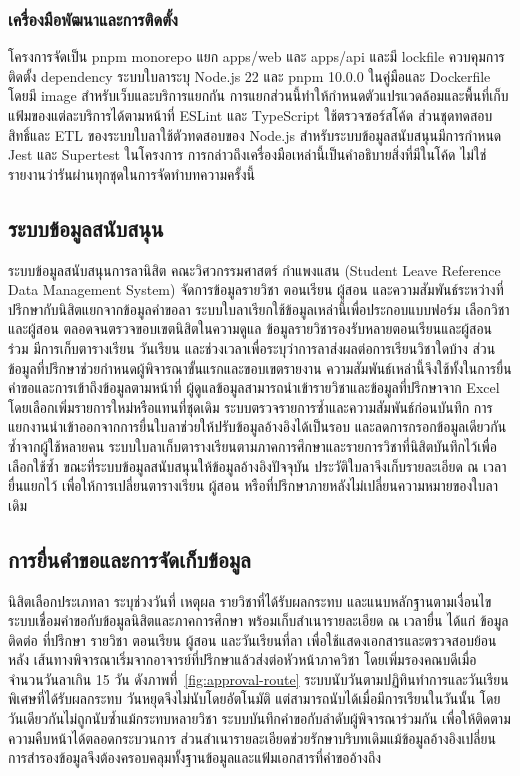\subsubsection{เครื่องมือพัฒนาและการติดตั้ง}
โครงการจัดเป็น pnpm monorepo แยก apps/web และ apps/api และมี lockfile ควบคุมการติดตั้ง dependency ระบบใบลาระบุ Node.js 22 และ pnpm 10.0.0 ในคู่มือและ Dockerfile โดยมี image สำหรับเว็บและบริการแยกกัน การแยกส่วนนี้ทำให้กำหนดตัวแปรแวดล้อมและพื้นที่เก็บแฟ้มของแต่ละบริการได้ตามหน้าที่
ESLint และ TypeScript ใช้ตรวจซอร์สโค้ด ส่วนชุดทดสอบสิทธิ์และ ETL ของระบบใบลาใช้ตัวทดสอบของ Node.js สำหรับระบบข้อมูลสนับสนุนมีการกำหนด Jest และ Supertest ในโครงการ การกล่าวถึงเครื่องมือเหล่านี้เป็นคำอธิบายสิ่งที่มีในโค้ด ไม่ใช่รายงานว่ารันผ่านทุกชุดในการจัดทำบทความครั้งนี้
\subsection{ระบบข้อมูลสนับสนุน}
ระบบข้อมูลสนับสนุนการลานิสิต คณะวิศวกรรมศาสตร์ กำแพงแสน (Student Leave Reference Data Management System) จัดการข้อมูลรายวิชา ตอนเรียน ผู้สอน และความสัมพันธ์ระหว่างที่ปรึกษากับนิสิตแยกจากข้อมูลคำขอลา ระบบใบลาเรียกใช้ข้อมูลเหล่านี้เพื่อประกอบแบบฟอร์ม เลือกวิชาและผู้สอน ตลอดจนตรวจขอบเขตนิสิตในความดูแล \cite{components}
ข้อมูลรายวิชารองรับหลายตอนเรียนและผู้สอนร่วม มีการเก็บตารางเรียน วันเรียน และช่วงเวลาเพื่อระบุว่าการลาส่งผลต่อการเรียนวิชาใดบ้าง ส่วนข้อมูลที่ปรึกษาช่วยกำหนดผู้พิจารณาขั้นแรกและขอบเขตรายงาน ความสัมพันธ์เหล่านี้จึงใช้ทั้งในการยื่นคำขอและการเข้าถึงข้อมูลตามหน้าที่
ผู้ดูแลข้อมูลสามารถนำเข้ารายวิชาและข้อมูลที่ปรึกษาจาก Excel โดยเลือกเพิ่มรายการใหม่หรือแทนที่ชุดเดิม ระบบตรวจรายการซ้ำและความสัมพันธ์ก่อนบันทึก การแยกงานนำเข้าออกจากการยื่นใบลาช่วยให้ปรับข้อมูลอ้างอิงได้เป็นรอบ และลดการกรอกข้อมูลเดียวกันซ้ำจากผู้ใช้หลายคน
ระบบใบลาเก็บตารางเรียนตามภาคการศึกษาและรายการวิชาที่นิสิตบันทึกไว้เพื่อเลือกใช้ซ้ำ ขณะที่ระบบข้อมูลสนับสนุนให้ข้อมูลอ้างอิงปัจจุบัน ประวัติใบลาจึงเก็บรายละเอียด ณ เวลายื่นแยกไว้ เพื่อให้การเปลี่ยนตารางเรียน ผู้สอน หรือที่ปรึกษาภายหลังไม่เปลี่ยนความหมายของใบลาเดิม
\subsection{การยื่นคำขอและการจัดเก็บข้อมูล}
นิสิตเลือกประเภทลา ระบุช่วงวันที่ เหตุผล รายวิชาที่ได้รับผลกระทบ และแนบหลักฐานตามเงื่อนไข ระบบเชื่อมคำขอกับข้อมูลนิสิตและภาคการศึกษา พร้อมเก็บสำเนารายละเอียด ณ เวลายื่น ได้แก่ ข้อมูลติดต่อ ที่ปรึกษา รายวิชา ตอนเรียน ผู้สอน และวันเรียนที่ลา เพื่อใช้แสดงเอกสารและตรวจสอบย้อนหลัง \cite{schema}
เส้นทางพิจารณาเริ่มจากอาจารย์ที่ปรึกษาแล้วส่งต่อหัวหน้าภาควิชา โดยเพิ่มรองคณบดีเมื่อจำนวนวันลาเกิน 15 วัน ดังภาพที่~\ref{fig:approval-route} ระบบนับวันตามปฏิทินทำการและวันเรียนพิเศษที่ได้รับผลกระทบ วันหยุดจึงไม่นับโดยอัตโนมัติ แต่สามารถนับได้เมื่อมีการเรียนในวันนั้น โดยวันเดียวกันไม่ถูกนับซ้ำแม้กระทบหลายวิชา
ระบบบันทึกคำขอกับลำดับผู้พิจารณาร่วมกัน เพื่อให้ติดตามความคืบหน้าได้ตลอดกระบวนการ ส่วนสำเนารายละเอียดช่วยรักษาบริบทเดิมแม้ข้อมูลอ้างอิงเปลี่ยน การสำรองข้อมูลจึงต้องครอบคลุมทั้งฐานข้อมูลและแฟ้มเอกสารที่คำขออ้างถึง
